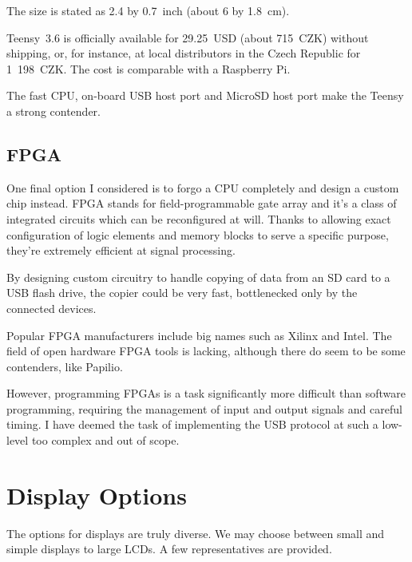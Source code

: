             The size is stated as 2.4 by 0.7~inch (about 6 by 1.8~cm).
            
            Teensy~3.6 is officially available for 29.25~USD (about 715~CZK) without shipping\cite{teensy-36}, or, for instance, at local distributors in the Czech Republic for 1~198~CZK\cite{teensy-36-snailshop}.  The cost is comparable with a Raspberry Pi.  
            
            The fast CPU, on-board USB host port and MicroSD host port make the Teensy a strong contender.
            
            
        \subsection{FPGA}
            One final option I considered is to forgo a CPU completely and design a custom chip instead.  FPGA stands for field-programmable gate array and it's a class of integrated circuits which can be reconfigured at will.  Thanks to allowing exact configuration of logic elements and memory blocks to serve a specific purpose, they're extremely efficient at signal processing\cite{sadrozinski2016applications}.
            
            By designing custom circuitry to handle copying of data from an SD card to a USB flash drive, the copier could be very fast, bottlenecked only by the connected devices.
            
            Popular FPGA manufacturers include big names such as Xilinx\cite{fpga-xilinx} and Intel\cite{fpga-intel}.  The field of open hardware FPGA tools is lacking, although there do seem to be some contenders, like Papilio\cite{fpga-papilio}. 
            
            However, programming FPGAs is a task significantly more difficult than software programming, requiring the management of input and output signals and careful timing.  I have deemed the task of implementing the USB protocol at such a low-level too complex and out of scope.
            
    \section{Display Options}
        The options for displays are truly diverse.  We may choose between small and simple displays to large LCDs.  A few representatives are provided.
        

